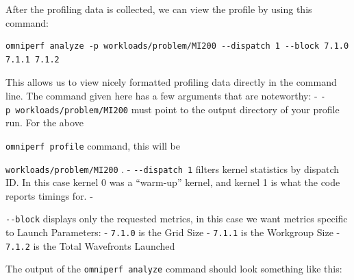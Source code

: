 \documentclass[
]{article}
\let\oldtexttt\texttt
\renewcommand{\texttt}[1]{
  \colorbox{Light}{\oldtexttt{#1}}
}
\begin{document}
After the profiling data is collected, we can view the profile by using
this command:

\begin{Verbatim}
omniperf analyze -p workloads/problem/MI200 --dispatch 1 --block 7.1.0 7.1.1 7.1.2
\end{Verbatim}

This allows us to view nicely formatted profiling data directly in the
command line. The command given here has a few arguments that are
noteworthy: - \texttt{-p\ workloads/problem/MI200} must point to the
output directory of your profile run. For the above
\texttt{omniperf\ profile} command, this will be
\texttt{workloads/problem/MI200}. - \texttt{-\/-dispatch\ 1} filters
kernel statistics by dispatch ID. In this case kernel 0 was a
``warm-up'' kernel, and kernel 1 is what the code reports timings for. -
\texttt{-\/-block} displays only the requested metrics, in this case we
want metrics specific to Launch Parameters: - \texttt{7.1.0} is the Grid
Size - \texttt{7.1.1} is the Workgroup Size - \texttt{7.1.2} is the
Total Wavefronts Launched

The output of the \texttt{omniperf\ analyze} command should look
something like this:
\end{document}
